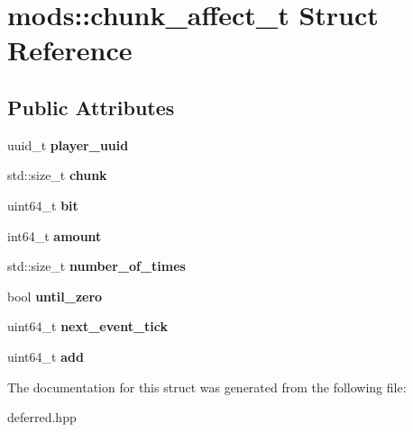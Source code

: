 \hypertarget{structmods_1_1chunk__affect__t}{}\section{mods\+:\+:chunk\+\_\+affect\+\_\+t Struct Reference}
\label{structmods_1_1chunk__affect__t}
\subsection*{Public Attributes}
\begin{DoxyCompactItemize}
\item 
\mbox{\label{structmods_1_1chunk__affect__t_ab4afedfa13bb942f7f4403e25e0e930e}} 
uuid\+\_\+t {\bfseries player\+\_\+uuid}
\item 
\mbox{\label{structmods_1_1chunk__affect__t_a24bee381e016b78736860dd92b87f249}} 
std\+::size\+\_\+t {\bfseries chunk}
\item 
\mbox{\label{structmods_1_1chunk__affect__t_ad7bde4c50547997fc49ee86f66a46011}} 
uint64\+\_\+t {\bfseries bit}
\item 
\mbox{\label{structmods_1_1chunk__affect__t_ae0d91074f8d47a565753bdae27295f5b}} 
int64\+\_\+t {\bfseries amount}
\item 
\mbox{\label{structmods_1_1chunk__affect__t_af05a2cb8f677b854108b443c1cdf4b5d}} 
std\+::size\+\_\+t {\bfseries number\+\_\+of\+\_\+times}
\item 
\mbox{\label{structmods_1_1chunk__affect__t_a96d858965dc7e96963f6191d7c68edc0}} 
bool {\bfseries until\+\_\+zero}
\item 
\mbox{\label{structmods_1_1chunk__affect__t_a7616612bb48df11524f5d1736f5239fc}} 
uint64\+\_\+t {\bfseries next\+\_\+event\+\_\+tick}
\item 
\mbox{\label{structmods_1_1chunk__affect__t_ac57f90f7649119eef3fdb08edbc1319a}} 
uint64\+\_\+t {\bfseries add}
\end{DoxyCompactItemize}


The documentation for this struct was generated from the following file\+:\begin{DoxyCompactItemize}
\item 
deferred.\+hpp\end{DoxyCompactItemize}
